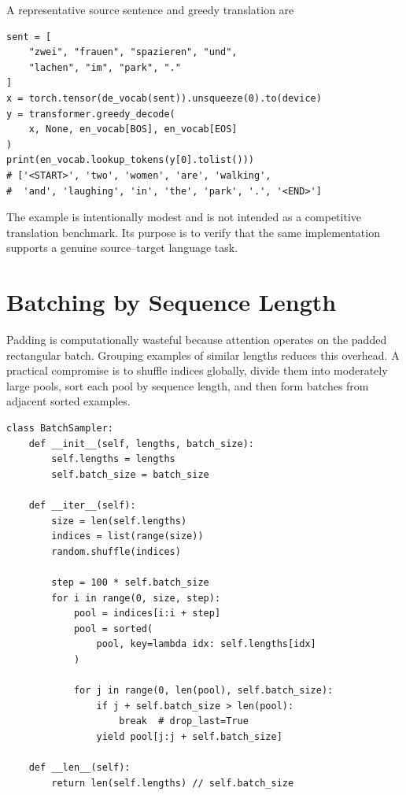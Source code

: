 \documentclass[11pt]{article}
\begin{document}
A representative source sentence and greedy translation are
\begin{lstlisting}[caption={Example translation.},label={lst:translation_example}]
sent = [
    "zwei", "frauen", "spazieren", "und",
    "lachen", "im", "park", "."
]
x = torch.tensor(de_vocab(sent)).unsqueeze(0).to(device)
y = transformer.greedy_decode(
    x, None, en_vocab[BOS], en_vocab[EOS]
)
print(en_vocab.lookup_tokens(y[0].tolist()))
# ['<START>', 'two', 'women', 'are', 'walking',
#  'and', 'laughing', 'in', 'the', 'park', '.', '<END>']
\end{lstlisting}

The example is intentionally modest and is not intended as a competitive translation benchmark. Its purpose is to verify that the same implementation supports a genuine source--target language task.

\section{Batching by Sequence Length}
\label{sec:batching}

Padding is computationally wasteful because attention operates on the padded rectangular batch. Grouping examples of similar lengths reduces this overhead. A practical compromise is to shuffle indices globally, divide them into moderately large pools, sort each pool by sequence length, and then form batches from adjacent sorted examples.

\begin{lstlisting}[caption={Length-aware batch sampler.},label={lst:batch_sampler}]
class BatchSampler:
    def __init__(self, lengths, batch_size):
        self.lengths = lengths
        self.batch_size = batch_size

    def __iter__(self):
        size = len(self.lengths)
        indices = list(range(size))
        random.shuffle(indices)

        step = 100 * self.batch_size
        for i in range(0, size, step):
            pool = indices[i:i + step]
            pool = sorted(
                pool, key=lambda idx: self.lengths[idx]
            )

            for j in range(0, len(pool), self.batch_size):
                if j + self.batch_size > len(pool):
                    break  # drop_last=True
                yield pool[j:j + self.batch_size]

    def __len__(self):
        return len(self.lengths) // self.batch_size
\end{lstlisting}
\end{document}
